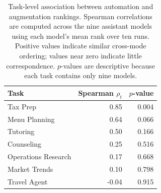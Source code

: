\begin{table}[H]
    \centering
    \caption{Task-level association between automation and augmentation rankings. Spearman correlations are computed across the nine assistant models using each model's mean rank over ten runs. Positive values indicate similar cross-mode ordering; values near zero indicate little correspondence. $p$-values are descriptive because each task contains only nine models.}
    \label{tab:mode-correlations}
    \small
    \begin{tabular}{lrr}
        \toprule
        Task & Spearman $\rho_t$ & $p$-value \\
        \midrule
        Tax Prep & 0.85 & 0.004 \\
        Menu Planning & 0.64 & 0.066 \\
        Tutoring & 0.50 & 0.166 \\
        Counseling & 0.25 & 0.516 \\
        Operations Research & 0.17 & 0.668 \\
        Market Trends & 0.10 & 0.798 \\
        Travel Agent & -0.04 & 0.915 \\
        \bottomrule
    \end{tabular}
\end{table}

